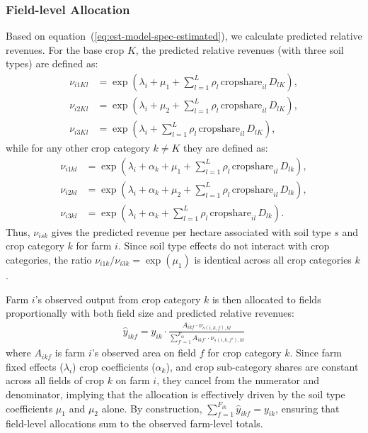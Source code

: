 \documentclass[12pt]{article}
\begin{document}
\subsubsection{Field-level Allocation}
Based on equation~(\ref{eq:est-model-spec-estimated}), we calculate predicted relative revenues.
For the base crop $K$, the predicted relative revenues (with three soil types) are defined as:
\begin{align*}
    \nu_{i1Kl} & = \exp\!\left(\lambda_i + \mu_1 + \sum_{l=1}^{L} \rho_l\,\text{cropshare}_{il}\,D_{lK}\right), \\
    \nu_{i2Kl} & = \exp\!\left(\lambda_i + \mu_2 + \sum_{l=1}^{L} \rho_l\,\text{cropshare}_{il}\,D_{lK}\right), \\
    \nu_{i3Kl} & = \exp\!\left( \lambda_i + \sum_{l=1}^{L} \rho_l\,\text{cropshare}_{il}\,D_{lK} \right),
\end{align*}
while for any other crop category $k \neq K$ they are defined as:
\begin{align*}
    \nu_{i1kl} & = \exp\!\left(\lambda_i + \alpha_k + \mu_1 + \sum_{l=1}^{L} \rho_l\,\text{cropshare}_{il}\,D_{lk}\right),\\
    \nu_{i2kl} & = \exp\!\left(\lambda_i + \alpha_k + \mu_2 + \sum_{l=1}^{L} \rho_l\,\text{cropshare}_{il}\,D_{lk}\right),\\
    \nu_{i3kl} & = \exp\!\left(\lambda_i + \alpha_k + \sum_{l=1}^{L} \rho_l\,\text{cropshare}_{il}\,D_{lk}\right).
\end{align*}
Thus, $\nu_{isk}$ gives the predicted revenue per hectare associated with soil type $s$ and crop category $k$ for farm $i$. 
Since soil type effects do not interact with crop categories, the ratio $\nu_{i1k}/\nu_{i3k} = \exp(\mu_1)$ is identical across all crop categories $k$.

Farm $i$'s observed output from crop category $k$ is then allocated to fields
proportionally with both field size and predicted relative revenues:
\begin{align}
    \hat{y}_{ikf} = y_{ik} \cdot \frac{A_{ikf} \cdot \nu_{s(i,k,f),kl}}
    {\sum_{f'=1}^{F_{ik}} A_{ikf'} \cdot \nu_{s(i,k,f'),kl}}
    \label{eq:allocation}
\end{align}
where $A_{ikf}$ is farm $i$'s observed area on field $f$ for crop category $k$.
Since farm fixed effects ($\lambda_i$) crop coefficients ($\alpha_k$), and crop sub-category shares are constant across all fields of crop $k$ on farm $i$, they cancel from the numerator and denominator, implying that the allocation is effectively driven by the soil type coefficients 
$\mu_1$ and $\mu_2$ alone.
By construction, $\sum_{f=1}^{F_{ik}} \hat{y}_{ikf} = y_{ik}$, ensuring that
field-level allocations sum to the observed farm-level totals.
\end{document}
